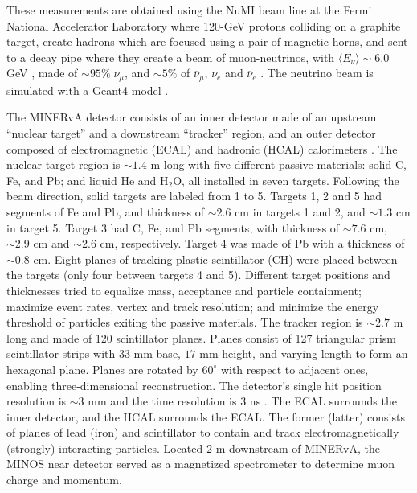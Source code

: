 \documentclass[aps,prl,twocolumn,superscriptaddress,nofootinbib]{revtex4-1}
\begin{document}
\par These measurements are obtained using the NuMI beam line at the Fermi National Accelerator Laboratory 
\cite{Adamson:2015dkw} where 120-GeV protons colliding on a graphite target, create hadrons which are 
focused using a pair of magnetic horns, and sent to a decay pipe where they create a beam of muon-neutrinos,
with $\langle E_{\nu}\rangle{\sim}6.0$ GeV \cite{Ainsworth:2020mqq}, made of ${\sim}95\%\;\nu_{\mu}$, and
${\sim}5\%$ of $\overline{\nu}_{\mu}$, $\nu_{e}$ and $\overline{\nu}_{e}$ \cite{MINERvA:2017dzh}. The neutrino
beam is simulated with a {\small Geant4} model \cite{GEANT4:2002zbu, MINERvA:2016iqn}.

\par The MINERvA detector consists of an inner detector made of an upstream ``nuclear target'' and a 
downstream ``tracker'' region, and an outer detector composed of electromagnetic (ECAL) and hadronic
(HCAL) calorimeters \cite{MINERvA:2013zvz}. The nuclear target region is ${\sim}1.4$ m long with five
different passive materials: solid C, Fe, and Pb; and liquid He and H$_{2}$O, all installed in seven
targets. Following the beam direction, solid targets are labeled from 1 to 5. Targets 1, 2 and 5 had
segments of Fe and Pb, and thickness of ${\sim}2.6$ cm in targets 1 and 2, and ${\sim}1.3$ cm in target
5. Target 3 had C, Fe, and Pb segments, with thickness of ${\sim}7.6$ cm, ${\sim}2.9$ cm and ${\sim}2.6$
cm, respectively. Target 4 was made of Pb with a thickness of ${\sim}0.8$ cm. Eight planes of tracking 
plastic scintillator (CH) were placed between the targets (only four between targets 4 and 5). Different
target positions and thicknesses tried to equalize mass, acceptance and particle containment; maximize
event rates, vertex and track resolution; and minimize the energy threshold of particles exiting the
passive materials. The tracker region is ${\sim}2.7$ m long and made of 120 scintillator planes. Planes
consist of 127 triangular prism scintillator strips with 33-mm base, $17$-mm height, and varying length
to form an hexagonal plane. Planes are rotated by $60^{\circ}$ with respect to adjacent ones, enabling
three-dimensional reconstruction. The detector's single hit position resolution is ${\sim}3$ mm and the
time resolution is 3 ns \cite{MINERvA:2013zvz}. The ECAL surrounds the inner detector, and the HCAL
surrounds the ECAL. The former (latter) consists of planes of lead (iron) and scintillator to contain
and track electromagnetically (strongly) interacting particles. Located 2 m downstream of MINERvA, the
MINOS near detector \cite{MINOS:1998kez, MINOS:2008hdf} served as a magnetized spectrometer to determine
muon charge and momentum.
\end{document}
